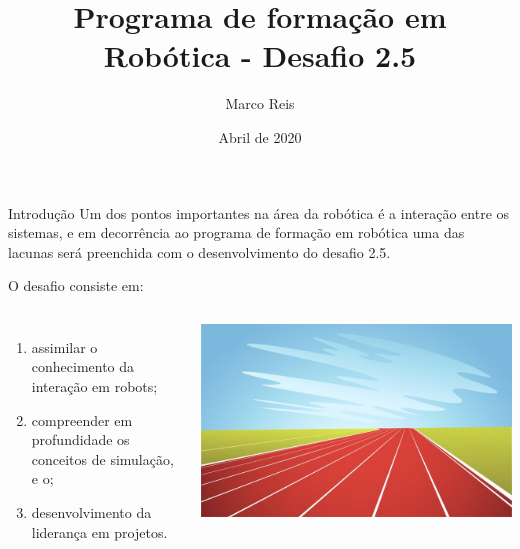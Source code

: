 \documentclass[aspectratio=169]{beamer}
\title              {Programa de formação em Robótica - Desafio 2.5}
\author             {Marco Reis}
\institute          {Laboratório de Robótica e Sistemas Autônomos, Senai Cimatec}
\date               {Abril de 2020}
\begin{document}
 \begin{frame}[t,plain]
    \titlepage
\end{frame}
\begin{frame}[t]{Introdução} 
    Um dos pontos importantes na área da robótica é a interação entre os sistemas, e em decorrência ao programa de formação em robótica uma das lacunas será preenchida com o desenvolvimento do desafio 2.5.
  
    O desafio consiste em:
    \newline
        \begin{columns}[c]
                \begin{enumerate}
                    \item assimilar o conhecimento da interação em robots;
                    \item compreender em profundidade os conceitos de simulação, e o;
                    \item desenvolvimento da liderança em projetos.
                \end{enumerate}
                \includegraphics[width=1\textwidth]{pista}
        \end{columns}
    \end{frame}
\end{document}
